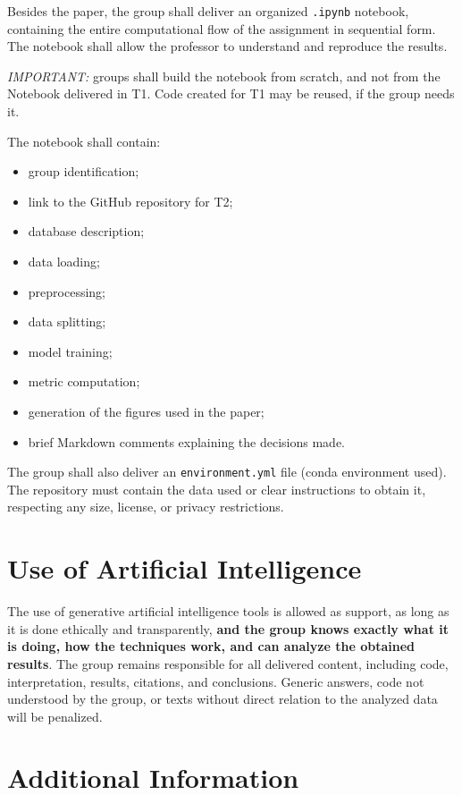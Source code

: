 \documentclass[a4paper]{ifacconf}
\begin{document}
Besides the paper, the group shall deliver an organized \texttt{.ipynb} notebook, containing the entire computational flow of the assignment in sequential form. The notebook shall allow the professor to understand and reproduce the results.

\textit{IMPORTANT:} groups shall build the notebook from scratch, and not from the Notebook delivered in T1. Code created for T1 may be reused, if the group needs it. 

The notebook shall contain:
\begin{itemize}
    \item group identification;
    \item link to the GitHub repository for T2;
    \item database description;
    \item data loading;
    \item preprocessing;
    \item data splitting;
    \item model training;
    \item metric computation;
    \item generation of the figures used in the paper;
    \item brief Markdown comments explaining the decisions made.
\end{itemize}

The group shall also deliver an \texttt{environment.yml} file (conda environment used). The repository must contain the data used or clear instructions to obtain it, respecting any size, license, or privacy restrictions.

\section{Use of Artificial Intelligence}

The use of generative artificial intelligence tools is allowed as support, as long as it is done ethically and transparently, \textbf{and the group knows exactly what it is doing, how the techniques work, and can analyze the obtained results}. The group remains responsible for all delivered content, including code, interpretation, results, citations, and conclusions. Generic answers, code not understood by the group, or texts without direct relation to the analyzed data will be penalized.

\section{Additional Information}
\end{document}

